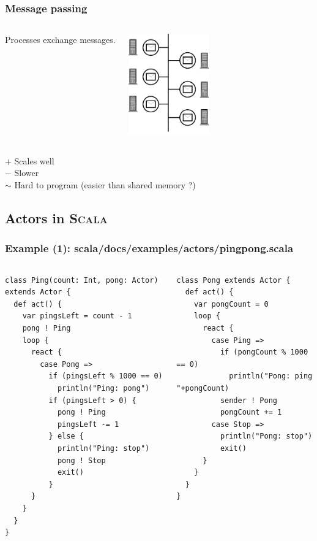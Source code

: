 \documentclass{beamer}
\newcommand{\scala}{\textsc{Scala}}
\begin{document}
\begin{frame}
  \frametitle{Message passing}
  
  \begin{columns}
  \column{5cm}
  Processes exchange messages.

  \column{5cm}
  \centering
  \includegraphics[width=3.5cm]{message}
  \end{columns}

  $+$ Scales well\\
  $-$ Slower \\
  $\sim$ Hard to program (easier than shared memory ?)
\end{frame}

\subsection{Actors in \scala{}}

\begin{frame}[fragile]
  \frametitle{Example (1): scala/docs/examples/actors/pingpong.scala}

  \begin{columns}
    \column{6cm}
{\tiny
\begin{verbatim}
class Ping(count: Int, pong: Actor) extends Actor {
  def act() {
    var pingsLeft = count - 1
    pong ! Ping
    loop {
      react {
        case Pong =>
          if (pingsLeft % 1000 == 0)
            println("Ping: pong")
          if (pingsLeft > 0) {
            pong ! Ping
            pingsLeft -= 1
          } else {
            println("Ping: stop")
            pong ! Stop
            exit()
          }
      }
    }
  }
}
\end{verbatim}
}

    \column{5cm}
{\tiny
\begin{verbatim}
class Pong extends Actor {
  def act() {
    var pongCount = 0
    loop {
      react {
        case Ping =>
          if (pongCount % 1000 == 0)
            println("Pong: ping "+pongCount)
          sender ! Pong
          pongCount += 1
        case Stop =>
          println("Pong: stop")
          exit()
      }
    }
  }
}
\end{verbatim}
}
  \end{columns}
\end{frame}
\end{document}
